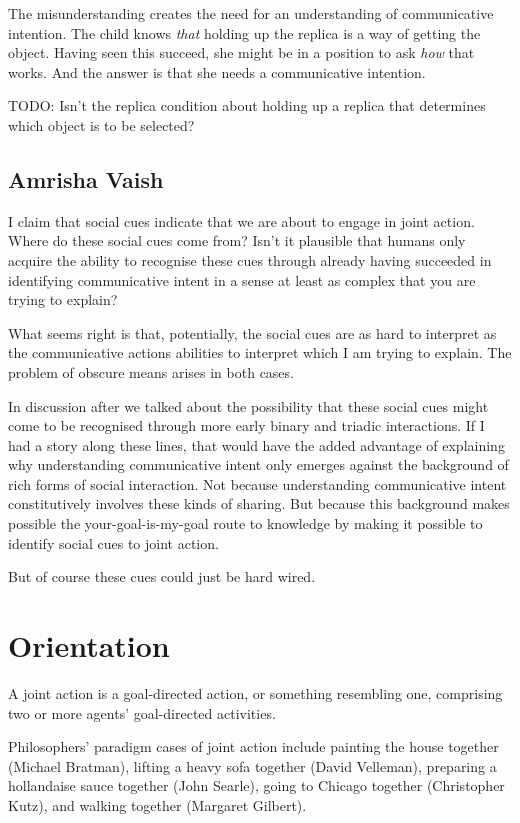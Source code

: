 \documentclass[14pt,a4paper]{extarticle}
\begin{document}
The misunderstanding creates the need for an understanding of communicative intention.  The child knows \emph{that} holding up the replica is a way of getting the object.  Having seen this succeed, she might be in a position to ask \emph{how} that works.  And the answer is that she needs a communicative intention.

TODO: Isn't the replica condition about holding up a replica that determines which object is to be selected?


\subsection{Amrisha Vaish}
I claim that social cues indicate that we are about to engage in joint action.  Where do these social cues come from?  Isn't it plausible that humans only acquire the ability to recognise these cues through already having succeeded in identifying communicative intent in a sense at least as complex that you are trying to explain?

What seems right is that, potentially, the social cues are as hard to interpret as the communicative actions abilities to interpret which I am trying to explain.  The problem of obscure means arises in both cases.

In discussion after we talked about the possibility that these social cues might come to be recognised through more early binary and triadic interactions.
If I had a story along these lines, that would have the added advantage of explaining why understanding communicative intent only emerges against the background of rich forms of social interaction.
Not because understanding communicative intent constitutively involves these kinds of sharing.  But because this background makes possible the your-goal-is-my-goal route to knowledge by making it possible to identify social cues to joint action.

But of course these cues could just be hard wired.





\section{Orientation}
A joint action is a goal-directed action, or something resembling one, comprising two or more agents' goal-directed activities. 

Philosophers' paradigm cases of joint action include painting the house together (Michael Bratman), lifting a heavy sofa together (David Velleman), preparing a hollandaise sauce together (John Searle), going to Chicago together (Christopher Kutz), and walking together (Margaret Gilbert).
\end{document}

